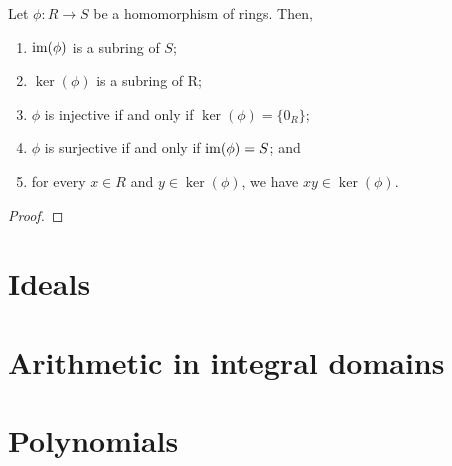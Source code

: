 \begin{prop}
Let $ \phi:R\to S $ be a homomorphism of rings. Then,
\begin{enumerate}
    \item $ \operatorname{im}(\phi) $ is a subring of $ S $;
    \item $ \ker(\phi) $ is a subring of R;
    \item $ \phi $ is injective if and only if $ \ker(\phi)=\{0_R\} $;
    \item $ \phi $ is surjective if and only if $ \operatorname{im}(\phi)=S $; and
    \item for every $ x\in R $ and $ y\in\ker(\phi) $, we have $ xy\in\ker(\phi) $.
\end{enumerate}
\end{prop}
\begin{proof}
\end{proof}

\section{Ideals}

\section{Arithmetic in integral domains}

\section{Polynomials}

